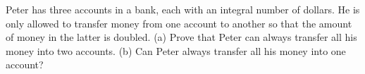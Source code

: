 Peter has three accounts in a bank, each with an integral number of dollars. He is only allowed to transfer money from one account to another so that the amount of money in the latter is doubled.
(a) Prove that Peter can always transfer all his money into two accounts.
(b) Can Peter always transfer all his money into one account?
